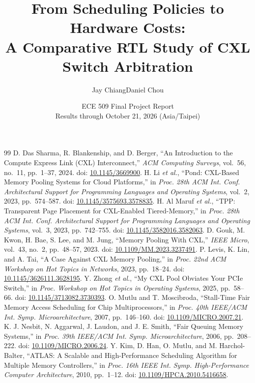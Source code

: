 \documentclass[10pt,letterpaper,twocolumn]{article}
\title{\vspace{-2em}\bfseries From Scheduling Policies to Hardware Costs:\\ A Comparative RTL Study of CXL Switch Arbitration}
\author{Jay Chiang\qquad Daniel Chou}
\date{\normalsize ECE 509 Final Project Report\\\small Results through October 21, 2026 (Asia/Taipei)}
\begin{document}
\maketitle


\begingroup\footnotesize
\begin{thebibliography}{99}
 D. Das Sharma, R. Blankenship, and D. Berger, ``An Introduction to the Compute Express Link (CXL) Interconnect,'' \emph{ACM Computing Surveys}, vol.~56, no.~11, pp.~1--37, 2024. doi: \href{https://doi.org/10.1145/3669900}{10.1145/3669900}.
 H. Li \emph{et al.}, ``Pond: CXL-Based Memory Pooling Systems for Cloud Platforms,'' in \emph{Proc. 28th ACM Int. Conf. Architectural Support for Programming Languages and Operating Systems}, vol.~2, 2023, pp.~574--587. doi: \href{https://doi.org/10.1145/3575693.3578835}{10.1145/3575693.3578835}.
 H. Al Maruf \emph{et al.}, ``TPP: Transparent Page Placement for CXL-Enabled Tiered-Memory,'' in \emph{Proc. 28th ACM Int. Conf. Architectural Support for Programming Languages and Operating Systems}, vol.~3, 2023, pp.~742--755. doi: \href{https://doi.org/10.1145/3582016.3582063}{10.1145/3582016.3582063}.
 D. Gouk, M. Kwon, H. Bae, S. Lee, and M. Jung, ``Memory Pooling With CXL,'' \emph{IEEE Micro}, vol.~43, no.~2, pp.~48--57, 2023. doi: \href{https://doi.org/10.1109/MM.2023.3237491}{10.1109/MM.2023.3237491}.
 P. Levis, K. Lin, and A. Tai, ``A Case Against CXL Memory Pooling,'' in \emph{Proc. 22nd ACM Workshop on Hot Topics in Networks}, 2023, pp.~18--24. doi: \href{https://doi.org/10.1145/3626111.3628195}{10.1145/3626111.3628195}.
 Y. Zhong \emph{et al.}, ``My CXL Pool Obviates Your PCIe Switch,'' in \emph{Proc. Workshop on Hot Topics in Operating Systems}, 2025, pp.~58--66. doi: \href{https://doi.org/10.1145/3713082.3730393}{10.1145/3713082.3730393}.
 O. Mutlu and T. Moscibroda, ``Stall-Time Fair Memory Access Scheduling for Chip Multiprocessors,'' in \emph{Proc. 40th IEEE/ACM Int. Symp. Microarchitecture}, 2007, pp.~146--160. doi: \href{https://doi.org/10.1109/MICRO.2007.21}{10.1109/MICRO.2007.21}.
 K. J. Nesbit, N. Aggarwal, J. Laudon, and J. E. Smith, ``Fair Queuing Memory Systems,'' in \emph{Proc. 39th IEEE/ACM Int. Symp. Microarchitecture}, 2006, pp.~208--222. doi: \href{https://doi.org/10.1109/MICRO.2006.24}{10.1109/MICRO.2006.24}.
 Y. Kim, D. Han, O. Mutlu, and M. Harchol-Balter, ``ATLAS: A Scalable and High-Performance Scheduling Algorithm for Multiple Memory Controllers,'' in \emph{Proc. 16th IEEE Int. Symp. High-Performance Computer Architecture}, 2010, pp.~1--12. doi: \href{https://doi.org/10.1109/HPCA.2010.5416658}{10.1109/HPCA.2010.5416658}.

\end{thebibliography}
\end{document}
